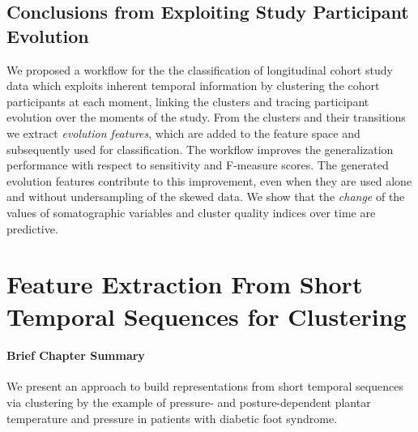 \documentclass[
  oneside]{book}
\newenvironment{infobox}[1]
  {
  \begin{chapter-summary}
  }
  {
  \end{chapter-summary}
  }
\begin{document}
\hypertarget{evo-conclusions}{%
\section{Conclusions from Exploiting Study Participant Evolution}\label{evo-conclusions}}

We proposed a workflow for the the classification of longitudinal cohort study data which exploits inherent temporal information by clustering the cohort participants at each moment, linking the clusters and tracing participant evolution over the moments of the study.
From the clusters and their transitions we extract \emph{evolution features}, which are added to the feature space and subsequently used for classification.
The workflow improves the generalization performance with respect to sensitivity and F-measure scores.
The generated evolution features contribute to this improvement, even when they are used alone and without undersampling of the skewed data.
We show that the \emph{change} of the values of somatographic variables and cluster quality indices over time are predictive.

\hypertarget{diabfoot}{%
\chapter{Feature Extraction From Short Temporal Sequences for Clustering}\label{diabfoot}}

\begin{infobox}{tasks.pdf}

\hypertarget{brief-chapter-summary-4}{%
\subsubsection*{Brief Chapter Summary}\label{brief-chapter-summary-4}}

We present an approach to build representations from short temporal sequences via clustering by the example of pressure- and posture-dependent plantar temperature and pressure in patients with diabetic foot syndrome.

\end{infobox}
\end{document}
